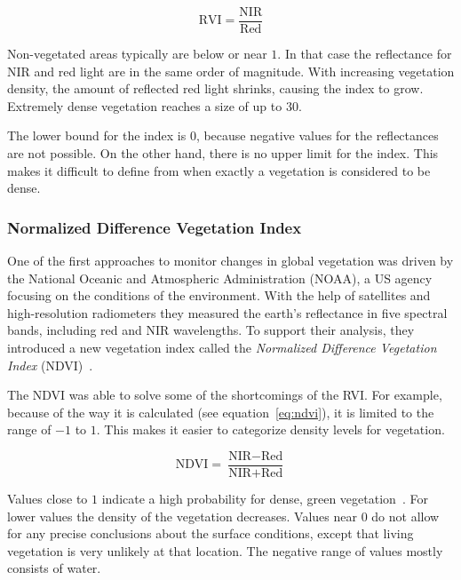 \begin{equation}
    \text{RVI} = \frac{\text{NIR}}{\text{Red}}
    \label{eq:rvi}
\end{equation}

Non-vegetated areas typically are below or near $1$. In that case the reflectance for NIR and red light are in the same order of magnitude. With increasing vegetation density, the amount of reflected red light shrinks, causing the index to grow. Extremely dense vegetation reaches a size of up to $30$.

The lower bound for the index is $0$, because negative values for the reflectances are not possible. On the other hand, there is no upper limit for the index. This makes it difficult to define from when exactly a vegetation is considered to be dense.

\subsubsection{Normalized Difference Vegetation Index}
One of the first approaches to monitor changes in global vegetation was driven by the National Oceanic and Atmospheric Administration (NOAA), a US agency focusing on the conditions of the environment. With the help of satellites and high-resolution radiometers they measured the earth's reflectance in five spectral bands, including red and NIR wavelengths. To support their analysis, they introduced a new vegetation index called the \emph{Normalized Difference Vegetation Index} (NDVI)~\cite{measuring_vegetation00}.

The NDVI was able to solve some of the shortcomings of the RVI. For example, because of the way it is calculated (see equation~\ref{eq:ndvi}), it is limited to the range of $-1$ to $1$. This makes it easier to categorize density levels for vegetation.

\begin{equation}
    \text{NDVI} = \frac{\text{NIR}-\text{Red}}{\text{NIR}+\text{Red}}
    \label{eq:ndvi}
\end{equation}

Values close to $1$ indicate a high probability for dense, green vegetation~\cite{gisg_ndvi20}. For lower values the density of the vegetation decreases. Values near $0$ do not allow for any precise conclusions about the surface conditions, except that living vegetation is very unlikely at that location. The negative range of values mostly consists of water.

